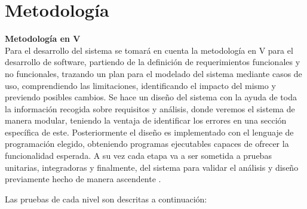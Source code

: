 \section{Metodología}

\textbf{Metodología en V}\\
Para el desarrollo del sistema se tomará en cuenta la metodología en V para el desarrollo de software, partiendo de la definición de requerimientos funcionales y no funcionales, trazando un plan para el modelado del sistema mediante casos de uso, comprendiendo las limitaciones, identificando el impacto del mismo y previendo posibles cambios. Se hace un diseño del sistema con la ayuda de toda la información recogida sobre requisitos y análisis, donde veremos el sistema de manera modular, teniendo la ventaja de identificar los errores en una sección específica de este. Posteriormente el diseño es implementado con el lenguaje de programación elegido, obteniendo programas ejecutables capaces de ofrecer la funcionalidad esperada. A su vez cada etapa va a ser sometida a pruebas unitarias, integradoras y finalmente, del sistema para validar el análisis y diseño previamente hecho de manera ascendente \citep{Metodologia1}.

Las pruebas de cada nivel son descritas a continuación:

